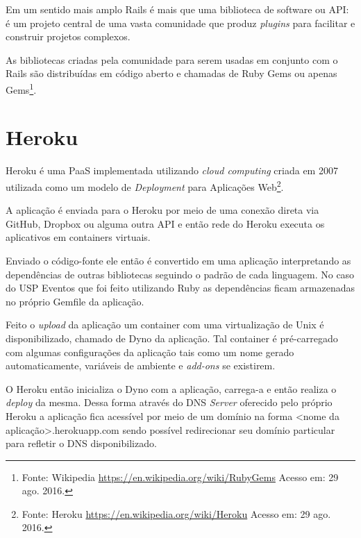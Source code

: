     \par Em um sentido mais amplo Rails é mais que uma biblioteca de software ou API: é um projeto central de uma vasta comunidade que produz \emph{plugins} para facilitar e construir projetos complexos.
	\par As bibliotecas criadas pela comunidade para serem usadas em conjunto com o Rails são distribuídas em código aberto e chamadas de Ruby Gems ou apenas Gems\footnote{Fonte: Wikipedia \url{https://en.wikipedia.org/wiki/RubyGems} Acesso em: 29 ago. 2016.}.

\section{Heroku}
\par Heroku é uma PaaS implementada utilizando \emph{cloud computing} criada em 2007 utilizada como um modelo de \emph{Deployment} para Aplicações Web\footnote{Fonte: Heroku \url{https://en.wikipedia.org/wiki/Heroku} Acesso em: 29 ago. 2016.}.
\par  A aplicação é enviada para o Heroku por meio de uma conexão direta via GitHub, Dropbox ou alguma outra API e então rede do Heroku executa os aplicativos em containers virtuais.
\par Enviado o código-fonte ele então é convertido em uma aplicação interpretando as dependências de outras bibliotecas seguindo o padrão de cada linguagem.  No caso do USP Eventos que foi feito utilizando Ruby as dependências ficam armazenadas no próprio Gemfile da aplicação.
\par Feito o \emph{upload} da aplicação um container com uma virtualização de Unix é disponibilizado, chamado de Dyno da aplicação. Tal container é pré-carregado com algumas configurações da aplicação tais como um nome gerado automaticamente, variáveis de ambiente e \emph{add-ons} se existirem.
\par O Heroku então inicializa o Dyno com a aplicação, carrega-a e então realiza o \emph{deploy} da mesma. Dessa forma através do DNS \emph{Server} oferecido pelo próprio Heroku a aplicação fica acessível por meio de um domínio na forma <nome da aplicação>.herokuapp.com sendo possível redirecionar seu domínio particular para refletir o DNS disponibilizado.
